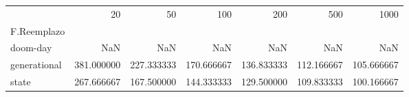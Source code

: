 \begin{tabular}{lrrrrrr}
\toprule
{} &        20   &        50   &        100  &        200  &        500  &        1000 \\
F.Reemplazo  &             &             &             &             &             &             \\
\midrule
doom-day     &         NaN &         NaN &         NaN &         NaN &         NaN &         NaN \\
generational &  381.000000 &  227.333333 &  170.666667 &  136.833333 &  112.166667 &  105.666667 \\
state        &  267.666667 &  167.500000 &  144.333333 &  129.500000 &  109.833333 &  100.166667 \\
\bottomrule
\end{tabular}

